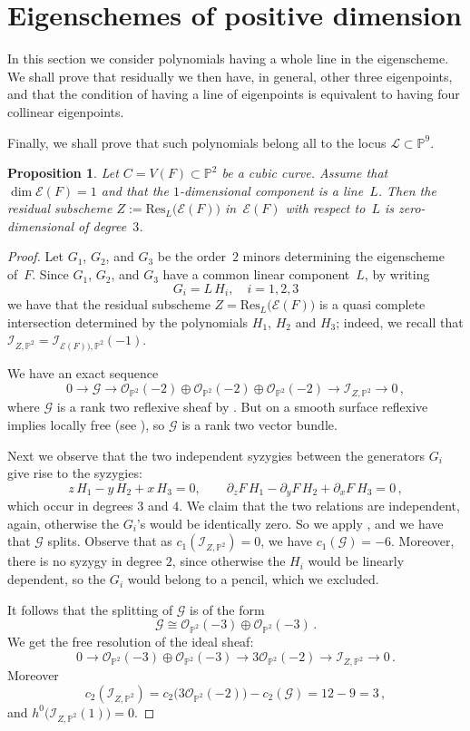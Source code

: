 \documentclass{amsart}
\theoremstyle{plain}
\newtheorem{prop}[lemma]{Proposition}
\theoremstyle{definition}
\newcommand{\p}{\mathbb{P}}
\newcommand{\sL}{\mathcal{L}}
\newcommand{\oo}{\mathcal{O}}
\newcommand{\Eig}[1]{\mathcal{E}\!\left( {#1} \right)}
\begin{document}
\section{Eigenschemes of positive dimension}
In this section we consider polynomials having a whole line in the eigenscheme. We shall prove that residually we then have, in general, other three eigenpoints, and that the condition of having a line of eigenpoints is equivalent to having four collinear eigenpoints.

Finally, we shall prove that such polynomials belong all to the locus $\sL \subset \p^9$.

\begin{prop}\label{p2}
Let $C = V(F) \subset \p^2$ be a cubic curve.
Assume that $\dim \Eig{F} = 1$ and that the $1$-dimensional component is a line~$L$.
Then the residual subscheme $Z := \mathrm{Res}_L \bigl( \Eig{F} \bigr)$ in~$\Eig{F}$ with respect to~$L$ is zero-dimensional of degree~$3$.
\end{prop}
\begin{proof}
Let $G_1$, $G_2$, and $G_3$ be the order~$2$ minors determining the eigenscheme of~$F$.
Since $G_1$, $G_2$, and $G_3$ have a common linear component~$L$, by writing
\[
 G_i = L \, H_i, \quad i=1,2,3
\]
we have that the residual subscheme $Z = \mathrm{Res}_L \bigl( \Eig{F} \bigr)$ is a quasi complete intersection
determined by the polynomials $H_1$, $H_2$ and $H_3$; indeed, we recall that $\mathcal{I}_{Z, \p^2} = \mathcal{I}_{\Eig{F}), \p^2} (-1)$.

We have an exact sequence
\[
 0 \to \mathcal{G} \to \oo_{\p^2} (-2) \oplus \oo_{\p^2} (-2) \oplus \oo_{\p^2} (-2) \to \mathcal{I}_{Z,\p^2} \to 0 \,,
\]
where $\mathcal{G}$ is a rank two reflexive sheaf by \cite[Proposition 1]{Hartshorne1980}.
But on a smooth surface reflexive implies locally free (see \cite[Example~1.1.6]{Huybrechts2010}),
so $\mathcal{G}$ is a rank two vector bundle.

Next we observe that the two independent
syzygies between the generators $G_i$ give rise to the syzygies:
\[
z\, H_1 - y\, H_2 + x\, H_3 = 0, \qquad \partial_z F\, H_1 - \partial_y F \, H_2 + \partial_x F \ H_3=0 \,,
\]
which occur in degrees $3$ and $4$. We claim that the two relations are independent, again,
otherwise the $G_i$'s would be identically zero. So we apply \cite[Proposition~12]{Ellia2020}, and we have that $\mathcal {G}$ splits. Observe that as $c_1(\mathcal {I}_{Z,\p^2})=0$, we have $c_1(\mathcal {G})=-6$. Moreover, there is no syzygy in degree $2$, since
otherwise the $H_i$ would be linearly dependent, so the $G_i$ would belong to a pencil, which we excluded.

It follows that the splitting of $\mathcal{G}$ is of the form
%
\[
\mathcal{G} \cong \oo_{\p^2} (-3) \oplus \oo_{\p^2} (-3) \,.
\]
%
We get the free resolution of the ideal sheaf:
%
\[
0\to \oo_{\p^2} (-3)\oplus \oo_{\p^2} (-3) \to 3\oo_{\p^2} (-2)\to \mathcal {I}_{Z,\p^2} \to 0 \,.
\]
%
Moreover
%
\[
c_2 (\mathcal{I}_{Z,\p^2} ) = c_2 \bigl( 3\oo_{\p^2}(-2) \bigr) - c_2 (\mathcal{G}) = 12 - 9 = 3 \,,
\]
%
and $h^0 \bigl( \mathcal{I}_{Z,\p^2}(1) \bigr) = 0$.
\end{proof}
\end{document}
